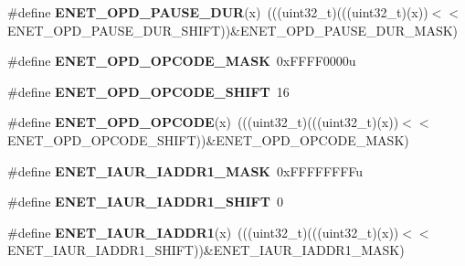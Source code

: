 \begin{DoxyCompactItemize}
\item 
\#define {\bfseries E\+N\+E\+T\+\_\+\+O\+P\+D\+\_\+\+P\+A\+U\+S\+E\+\_\+\+D\+UR}(x)~(((uint32\+\_\+t)(((uint32\+\_\+t)(x))$<$$<$E\+N\+E\+T\+\_\+\+O\+P\+D\+\_\+\+P\+A\+U\+S\+E\+\_\+\+D\+U\+R\+\_\+\+S\+H\+I\+FT))\&E\+N\+E\+T\+\_\+\+O\+P\+D\+\_\+\+P\+A\+U\+S\+E\+\_\+\+D\+U\+R\+\_\+\+M\+A\+SK)\hypertarget{group__ENET__Register__Masks_ga541dcbba44e5eff5ae1d0cb74b5a55af}{}\label{group__ENET__Register__Masks_ga541dcbba44e5eff5ae1d0cb74b5a55af}

\item 
\#define {\bfseries E\+N\+E\+T\+\_\+\+O\+P\+D\+\_\+\+O\+P\+C\+O\+D\+E\+\_\+\+M\+A\+SK}~0x\+F\+F\+F\+F0000u\hypertarget{group__ENET__Register__Masks_ga91f8d538d8541612f56f3a8e42d99c92}{}\label{group__ENET__Register__Masks_ga91f8d538d8541612f56f3a8e42d99c92}

\item 
\#define {\bfseries E\+N\+E\+T\+\_\+\+O\+P\+D\+\_\+\+O\+P\+C\+O\+D\+E\+\_\+\+S\+H\+I\+FT}~16\hypertarget{group__ENET__Register__Masks_ga775f746ec6513ddb5be567b51b1b8c1b}{}\label{group__ENET__Register__Masks_ga775f746ec6513ddb5be567b51b1b8c1b}

\item 
\#define {\bfseries E\+N\+E\+T\+\_\+\+O\+P\+D\+\_\+\+O\+P\+C\+O\+DE}(x)~(((uint32\+\_\+t)(((uint32\+\_\+t)(x))$<$$<$E\+N\+E\+T\+\_\+\+O\+P\+D\+\_\+\+O\+P\+C\+O\+D\+E\+\_\+\+S\+H\+I\+FT))\&E\+N\+E\+T\+\_\+\+O\+P\+D\+\_\+\+O\+P\+C\+O\+D\+E\+\_\+\+M\+A\+SK)\hypertarget{group__ENET__Register__Masks_gac6895ba9997a60b06b3a1a85e18259e7}{}\label{group__ENET__Register__Masks_gac6895ba9997a60b06b3a1a85e18259e7}

\item 
\#define {\bfseries E\+N\+E\+T\+\_\+\+I\+A\+U\+R\+\_\+\+I\+A\+D\+D\+R1\+\_\+\+M\+A\+SK}~0x\+F\+F\+F\+F\+F\+F\+F\+Fu\hypertarget{group__ENET__Register__Masks_ga2883158c5de2f27f29274ce0251b2f81}{}\label{group__ENET__Register__Masks_ga2883158c5de2f27f29274ce0251b2f81}

\item 
\#define {\bfseries E\+N\+E\+T\+\_\+\+I\+A\+U\+R\+\_\+\+I\+A\+D\+D\+R1\+\_\+\+S\+H\+I\+FT}~0\hypertarget{group__ENET__Register__Masks_ga305ef40dd7fb1f6e7e0f4ba815db5210}{}\label{group__ENET__Register__Masks_ga305ef40dd7fb1f6e7e0f4ba815db5210}

\item 
\#define {\bfseries E\+N\+E\+T\+\_\+\+I\+A\+U\+R\+\_\+\+I\+A\+D\+D\+R1}(x)~(((uint32\+\_\+t)(((uint32\+\_\+t)(x))$<$$<$E\+N\+E\+T\+\_\+\+I\+A\+U\+R\+\_\+\+I\+A\+D\+D\+R1\+\_\+\+S\+H\+I\+FT))\&E\+N\+E\+T\+\_\+\+I\+A\+U\+R\+\_\+\+I\+A\+D\+D\+R1\+\_\+\+M\+A\+SK)\hypertarget{group__ENET__Register__Masks_ga43bd5e0645a476549c8662de0249e426}{}\label{group__ENET__Register__Masks_ga43bd5e0645a476549c8662de0249e426}


\end{DoxyCompactItemize}
